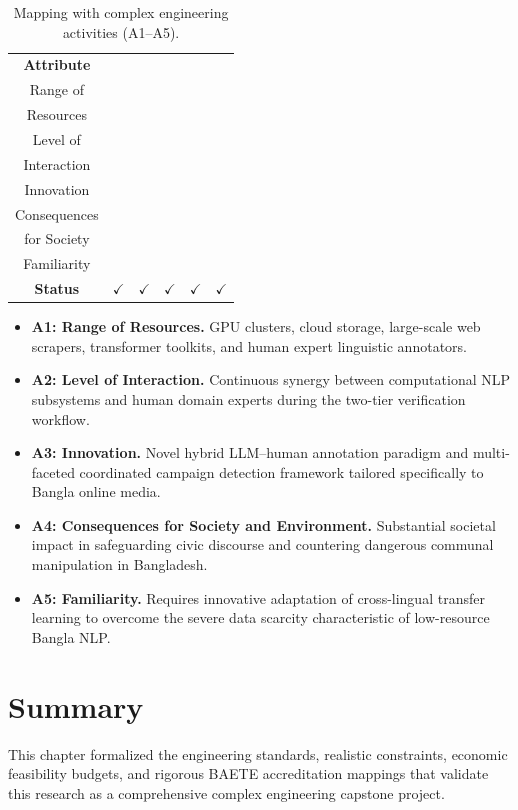 \documentclass[12pt,a4paper]{report}
\newcommand{\ck}{$\checkmark$}
\begin{document}
\begin{table}[H]
\centering
\caption{Mapping with complex engineering activities (A1--A5).}\label{tab:a1a5}
\renewcommand{\arraystretch}{1.5}
\begin{tabular}{@{}c|c|c|c|c|c@{}}
\toprule
\textbf{Attribute} & \makecell{\textbf{A1}\\Range of\\Resources} & \makecell{\textbf{A2}\\Level of\\Interaction} & \makecell{\textbf{A3}\\Innovation} & \makecell{\textbf{A4}\\Consequences\\for Society} & \makecell{\textbf{A5}\\Familiarity}\\
\midrule
\textbf{Status} & \ck & \ck & \ck & \ck & \ck\\
\bottomrule
\end{tabular}
\end{table}

\begin{itemize}
  \item \textbf{A1: Range of Resources.} GPU clusters, cloud storage, large-scale
        web scrapers, transformer toolkits, and human expert linguistic annotators.
  \item \textbf{A2: Level of Interaction.} Continuous synergy between computational
        NLP subsystems and human domain experts during the two-tier verification
        workflow.
  \item \textbf{A3: Innovation.} Novel hybrid LLM--human annotation paradigm and
        multi-faceted coordinated campaign detection framework tailored
        specifically to Bangla online media.
  \item \textbf{A4: Consequences for Society and Environment.} Substantial societal
        impact in safeguarding civic discourse and countering dangerous communal
        manipulation in Bangladesh.
  \item \textbf{A5: Familiarity.} Requires innovative adaptation of cross-lingual
        transfer learning to overcome the severe data scarcity characteristic of
        low-resource Bangla NLP.
\end{itemize}

\section{Summary}
This chapter formalized the engineering standards, realistic constraints, economic
feasibility budgets, and rigorous BAETE accreditation mappings that validate this
research as a comprehensive complex engineering capstone project.
\end{document}
